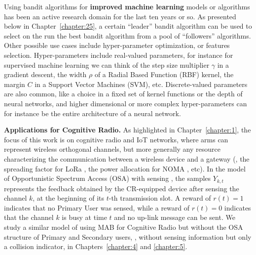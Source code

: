     Using bandit algorithms for \textbf{improved machine learning} models or algorithms has been an active research domain for the last ten years or so.
    As presented below in Chapter~\ref{chapter:25}, a certain ``leader'' bandit algorithm can be used to select on the run the best bandit algorithm from a pool of ``followers'' algorithms.
    Other possible use cases include hyper-parameter optimization, or features selection.
    Hyper-parameters include real-valued parameters,
    for instance for supervised machine learning we can think of
    the step size multiplier $\gamma$ in a gradient descent,
    the width $\rho$ of a Radial Based Function (RBF) kernel,
    the margin $C$ in a Support Vector Machines (SVM), etc.
    Discrete-valued parameters are also common, like a choice in a fixed set of kernel functions or the depth of neural networks,
    and higher dimensional or more complex hyper-parameters can for instance be the entire architecture of a neural network.


\textbf{Applications for Cognitive Radio.}
%
As highlighted in Chapter~\ref{chapter:1},
the focus of this work is on cognitive radio and IoT networks, where arms can represent wireless orthogonal channels, but more generally any resource characterizing the communication between a wireless device and a gateway (\eg, the spreading factor for LoRa \cite{KerkoucheAlami18}, the power allocation for NOMA \cite{TianWangWangSong2019}, etc).
%
In the model of Opportunistic Spectrum Access (OSA) with sensing \cite{Jouini09,Jouini10}, the samples $Y_{k,t}$ represents the feedback obtained by the CR-equipped device after sensing the channel $k$, at the beginning of its $t$-th transmission slot.
A reward of $r(t) = 1$ indicates that no Primary User was sensed, while a reward of $r(t)=0$ indicates that the channel $k$ is busy at time $t$ and no up-link message can be sent.
%
We study a similar model of using MAB for Cognitive Radio but without the OSA structure of Primary and Secondary users, \ie, without sensing information but only a collision indicator, in Chapters~\ref{chapter:4} and \ref{chapter:5}.


